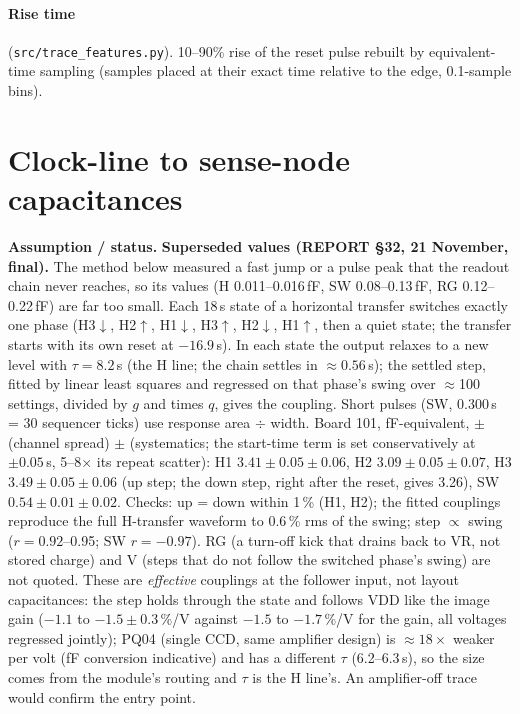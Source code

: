 \documentclass[10pt,a4paper]{article}
\newcommand{\code}[1]{\texttt{\small #1}}
\newcommand{\caveat}[1]{\par\smallskip\noindent\colorbox{orange!10}{\parbox{\dimexpr\linewidth-2\fboxsep}{\small\textbf{Assumption / status.} #1}}\par\smallskip}
\begin{document}
\paragraph{Rise time} (\code{src/trace\_features.py}). 10--90\% rise of the reset pulse rebuilt by equivalent-time
sampling (samples placed at their exact time relative to the edge, 0.1-sample bins).

\section{Clock-line to sense-node capacitances}\label{sec:cpl}

\caveat{\textbf{Superseded values (REPORT \S32, 21 November, final).} The method below measured a fast jump or a pulse peak
that the readout chain never reaches, so its values (H 0.011--0.016\,fF, SW 0.08--0.13\,fF, RG 0.12--0.22\,fF) are far too
small. Each 18\,\textmu s state of a horizontal transfer switches exactly one phase (H3$\downarrow$, H2$\uparrow$,
H1$\downarrow$, H3$\uparrow$, H2$\downarrow$, H1$\uparrow$, then a quiet state; the transfer starts with its own reset
at $-16.9$\,\textmu s). In each state the output relaxes to a new level with $\tau=8.2$\,\textmu s (the H line; the chain
settles in $\approx0.56$\,\textmu s); the settled step, fitted by linear least squares and regressed on that phase's swing over
$\approx$100 settings, divided by $g$ and times $q$, gives the coupling. Short pulses (SW, 0.300\,\textmu s = 30 sequencer
ticks) use response area $\div$ width. Board 101, fF-equivalent, $\pm$ (channel spread) $\pm$ (systematics; the start-time term is set conservatively at
$\pm0.05$\,\textmu s, 5--8$\times$ its repeat scatter):
H1 $3.41\pm0.05\pm0.06$, H2 $3.09\pm0.05\pm0.07$, H3 $3.49\pm0.05\pm0.06$ (up step; the down step, right after the reset,
gives 3.26), SW $0.54\pm0.01\pm0.02$. Checks: up = down within 1\,\% (H1, H2); the fitted couplings reproduce the full
H-transfer waveform to 0.6\,\% rms of the swing; step $\propto$ swing ($r=0.92$--0.95; SW $r=-0.97$). RG (a turn-off kick
that drains back to VR, not stored charge) and V (steps that do not follow the switched phase's swing) are not quoted.
These are \emph{effective} couplings at the follower input, not layout capacitances: the step holds through the state and
follows VDD like the image gain ($-1.1$ to $-1.5\pm0.3$\,\%/V against $-1.5$ to $-1.7$\,\%/V for the gain, all voltages
regressed jointly); PQ04 (single CCD, same amplifier design) is $\approx18\times$ weaker per volt (fF conversion indicative)
and has a different $\tau$ (6.2--6.3\,\textmu s), so the size comes from the module's routing and $\tau$ is the H line's.
An amplifier-off trace would confirm the entry point.}
\end{document}
